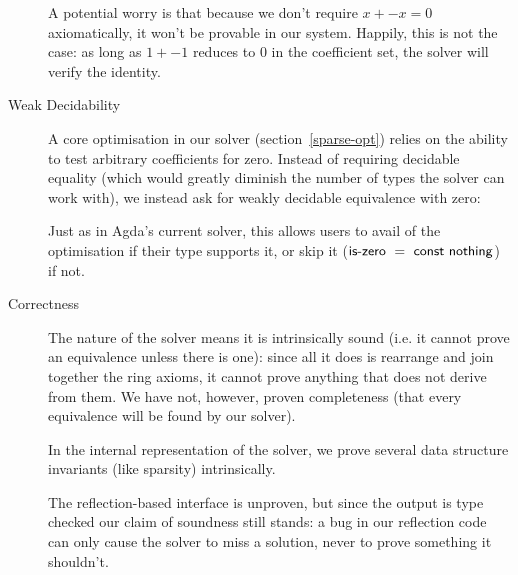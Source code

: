 \documentclass[12pt]{article}
\begin{document}
\begin{description}
    A potential worry is that because we don't require \(x + -x = 0\)
    axiomatically, it won't be provable in our system. Happily, this is not the
    case: as long as \(1 + -1\) reduces to \(0\) in the coefficient set, the
    solver will verify the identity.
  \item[Weak Decidability] A core optimisation in our solver
    (section~\ref{sparse-opt}) relies on the ability to test arbitrary
    coefficients for zero. Instead of requiring decidable equality (which would
    greatly diminish the number of types the solver can work with), we instead
    ask for weakly decidable equivalence with zero:
    \begin{center}
      \vspace{-10pt}
    \end{center}
    Just as in Agda's current solver, this allows users to avail of the
    optimisation if their type supports it, or skip it
    (\(\AgdaFunction{is-zero}~=~\AgdaFunction{const}~\AgdaInductiveConstructor{nothing}\))
    if not.
  \item[Correctness] The nature of the solver means it is intrinsically sound
    (i.e. it cannot prove an equivalence unless there is one): since all it does
    is rearrange and join together the ring axioms, it cannot prove anything
    that does not derive from them. We have not, however, proven completeness
    (that every equivalence will be found by our solver).

    In the internal representation of the solver, we prove several data structure
    invariants (like sparsity) intrinsically.

    The reflection-based interface is unproven, but since the output is type
    checked our claim of soundness still stands: a bug in our reflection code
    can only cause the solver to miss a solution, never to prove something it
    shouldn't.
\end{description}
\end{document}
